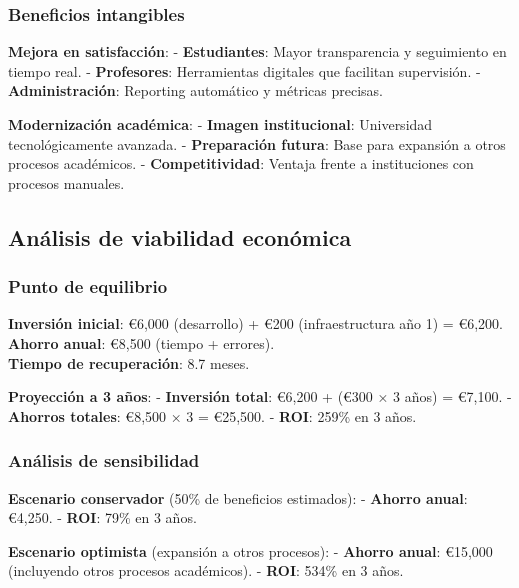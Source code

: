 \documentclass[12pt,a4paper,oneside]{report}
\begin{document}
\subsubsection{Beneficios intangibles}\label{beneficios-intangibles}

\textbf{Mejora en satisfacción}: - \textbf{Estudiantes}: Mayor
transparencia y seguimiento en tiempo real. - \textbf{Profesores}:
Herramientas digitales que facilitan supervisión. -
\textbf{Administración}: Reporting automático y métricas precisas.

\textbf{Modernización académica}: - \textbf{Imagen institucional}:
Universidad tecnológicamente avanzada. - \textbf{Preparación futura}:
Base para expansión a otros procesos académicos. -
\textbf{Competitividad}: Ventaja frente a instituciones con procesos
manuales.

\subsection{Análisis de viabilidad
económica}\label{anuxe1lisis-de-viabilidad-econuxf3mica}

\subsubsection{Punto de equilibrio}\label{punto-de-equilibrio}

\textbf{Inversión inicial}: €6,000 (desarrollo) + €200 (infraestructura
año 1) = €6,200.\\
\textbf{Ahorro anual}: €8,500 (tiempo + errores).\\
\textbf{Tiempo de recuperación}: 8.7 meses.

\textbf{Proyección a 3 años}: - \textbf{Inversión total}: €6,200 + (€300
× 3 años) = €7,100. - \textbf{Ahorros totales}: €8,500 × 3 = €25,500. -
\textbf{ROI}: 259\% en 3 años.

\subsubsection{Análisis de
sensibilidad}\label{anuxe1lisis-de-sensibilidad}

\textbf{Escenario conservador} (50\% de beneficios estimados): -
\textbf{Ahorro anual}: €4,250. - \textbf{ROI}: 79\% en 3 años.

\textbf{Escenario optimista} (expansión a otros procesos): -
\textbf{Ahorro anual}: €15,000 (incluyendo otros procesos académicos). -
\textbf{ROI}: 534\% en 3 años.
\end{document}
